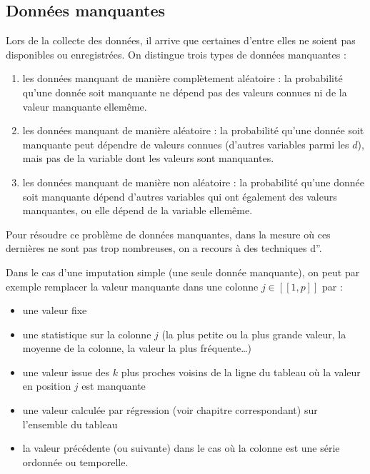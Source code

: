 \documentclass[letterpaper,10pt,french]{sphinxmanual}
\begin{document}
\subsection{Données manquantes}
\label{\detokenize{statsdescriptives:donnees-manquantes}}
\sphinxAtStartPar
Lors de la collecte des données, il arrive que certaines d’entre elles ne soient pas disponibles ou enregistrées. On distingue trois types de données manquantes :
\begin{enumerate}
%
\item {} 
\sphinxAtStartPar
les données manquant de manière complètement aléatoire :  la probabilité qu’une donnée soit manquante ne dépend pas des valeurs connues ni de la valeur manquante elle\sphinxhyphen{}même.

\item {} 
\sphinxAtStartPar
les données manquant de manière aléatoire :  la probabilité qu’une donnée soit manquante peut dépendre de valeurs connues (d’autres variables parmi les \(d\)), mais pas de la variable dont les valeurs sont manquantes.

\item {} 
\sphinxAtStartPar
les données manquant de manière non aléatoire : la probabilité qu’une donnée soit manquante dépend d’autres variables qui ont également des valeurs manquantes, ou elle dépend de la variable elle\sphinxhyphen{}même.

\end{enumerate}

\sphinxAtStartPar
Pour résoudre ce problème de données manquantes, dans la mesure où ces dernières ne sont pas trop nombreuses, on a recours à des techniques d”.

\sphinxAtStartPar
Dans le cas d’une imputation simple (une seule donnée manquante), on peut par exemple remplacer la valeur manquante dans une colonne \(j\in[\![1,p]\!]\) par :
\begin{itemize}
\item {} 
\sphinxAtStartPar
une valeur fixe

\item {} 
\sphinxAtStartPar
une statistique sur la colonne \(j\) (la plus petite ou la plus grande valeur, la moyenne de la colonne, la valeur la plus fréquente…)

\item {} 
\sphinxAtStartPar
une valeur issue des \(k\) plus proches voisins de la ligne du tableau où la valeur en position \(j\) est manquante

\item {} 
\sphinxAtStartPar
une valeur calculée par régression (voir chapitre correspondant) sur l’ensemble du tableau

\item {} 
\sphinxAtStartPar
la valeur précédente (ou suivante) dans le cas où la colonne est une série ordonnée ou temporelle.

\end{itemize}
\end{document}
